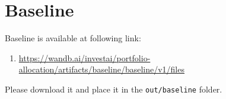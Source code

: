 \documentclass[../xlapes02]{subfiles}
\begin{document}
%
%
%


    \section{Baseline}
    Baseline is available at following link:
    \begin{enumerate}
        \item \url{https://wandb.ai/investai/portfolio-allocation/artifacts/baseline/baseline/v1/files}
    \end{enumerate}
    Please download it and place it in the \texttt{out/baseline} folder.
\end{document}
